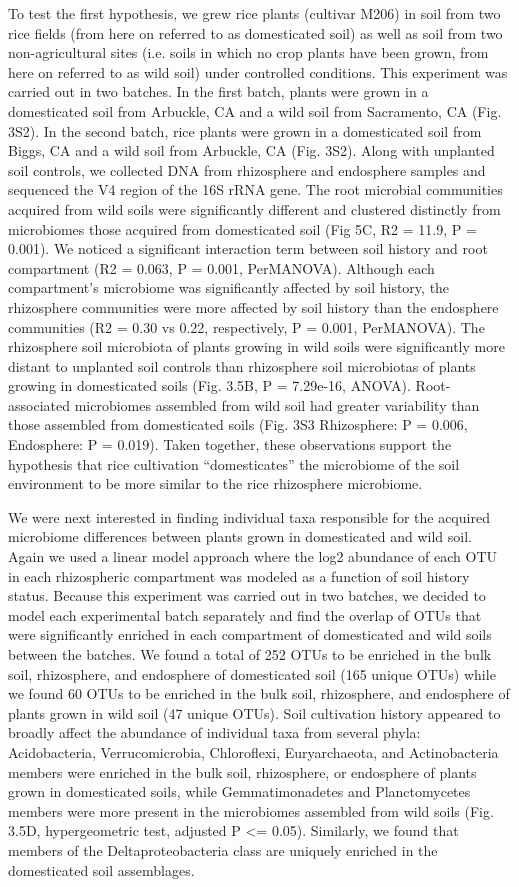 To test the first hypothesis, we grew rice plants (cultivar M206) in soil from two rice fields (from here on referred to as domesticated soil) as well as soil from two non-agricultural sites (i.e. soils in which no crop plants have been grown, from here on referred to as wild soil) under controlled conditions. This experiment was carried out in two batches. In the first batch, plants were grown in a domesticated soil from Arbuckle, CA and a wild soil from Sacramento, CA (Fig. 3S2). In the second batch, rice plants were grown in a domesticated soil from Biggs, CA and a wild soil from Arbuckle, CA (Fig. 3S2). Along with unplanted soil controls, we collected DNA from rhizosphere and endosphere samples and sequenced the V4 region of the 16S rRNA gene. The root microbial communities acquired from wild soils were significantly different and clustered distinctly from microbiomes those acquired from domesticated soil (Fig 5C, R2 = 11.9, P = 0.001). We noticed a significant interaction term between soil history and root compartment (R2 = 0.063, P = 0.001, PerMANOVA). Although each compartment's microbiome was significantly affected by soil history, the rhizosphere communities were more affected by soil history than the endosphere communities (R2 = 0.30 vs 0.22, respectively, P = 0.001, PerMANOVA). The rhizosphere soil microbiota of plants growing in wild soils were significantly more distant to unplanted soil controls than rhizosphere soil microbiotas of plants growing in domesticated soils (Fig. 3.5B, P = 7.29e-16, ANOVA). Root-associated microbiomes assembled from wild soil had greater variability than those assembled from domesticated soils (Fig. 3S3 Rhizosphere: P = 0.006, Endosphere: P = 0.019). Taken together, these observations support the hypothesis that rice cultivation “domesticates” the microbiome of the soil environment to be more similar to the rice rhizosphere microbiome.

We were next interested in finding individual taxa responsible for the acquired microbiome differences between plants grown in domesticated and wild soil. Again we used a linear model approach where the log2 abundance of each OTU in each rhizospheric compartment was modeled as a function of soil history status. Because this experiment was carried out in two batches, we decided to model each experimental batch separately and find the overlap of OTUs that were significantly enriched in each compartment of domesticated and wild soils between the batches. We found a total of 252 OTUs to be enriched in the bulk soil, rhizosphere, and endosphere of domesticated soil (165 unique OTUs) while we found 60 OTUs to be enriched in the bulk soil, rhizosphere, and endosphere of plants grown in wild soil (47 unique OTUs). Soil cultivation history appeared to broadly affect the abundance of individual taxa from several phyla: Acidobacteria, Verrucomicrobia, Chloroflexi, Euryarchaeota, and Actinobacteria members were enriched in the bulk soil, rhizosphere, or endosphere of plants grown in domesticated soils, while Gemmatimonadetes and Planctomycetes members were more present in the microbiomes assembled from wild soils (Fig. 3.5D, hypergeometric test, adjusted P <= 0.05). Similarly, we found that members of the Deltaproteobacteria class are uniquely enriched in the domesticated soil assemblages. 

